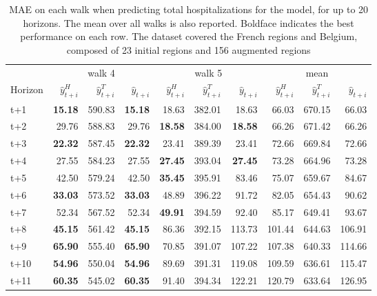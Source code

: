 \begin{table}[H]
\centering
\caption{MAE on each walk when predicting total hospitalizations for the model, for up to 20 horizons. The mean over all walks is also reported. Boldface indicates the best performance on each row. The dataset covered the French regions and Belgium, composed of 23 initial regions and 156 augmented regions }
\label{tab:MAE_walk_assemble}
\begin{tabular}{lrrrrrrrrr}
\toprule
 & \multicolumn{3}{c}{walk 4} & \multicolumn{3}{c}{walk 5} & \multicolumn{3}{c}{mean} 
\\

\cmidrule(lr){2-4} \cmidrule(lr){5-7} \cmidrule(lr){8-10} 
Horizon & $\hat{y}_{t+i}^H$ & $\hat{y}_{t+i}^T$ & $\hat{y}_{t+i}$ & $\hat{y}_{t+i}^H$ & $\hat{y}_{t+i}^T$ & $\hat{y}_{t+i}$ & $\hat{y}_{t+i}^H$ & $\hat{y}_{t+i}^T$ & $\hat{y}_{t+i}$ \\
\midrule
t+1  & \textbf{15.18}  & 590.83  & \textbf{15.18}  & 18.63  & 382.01  & 18.63  & 66.03  & 670.15  & 66.03  \\
t+2  & 29.76  & 588.83  & 29.76  & \textbf{18.58}  & 384.00  & \textbf{18.58}  & 66.26  & 671.42  & 66.26  \\
t+3  & \textbf{22.32}  & 587.45  & \textbf{22.32}  & 23.41  & 389.39  & 23.41  & 72.66  & 669.84  & 72.66  \\
t+4  & 27.55  & 584.23  & 27.55  & \textbf{27.45}  & 393.04  & \textbf{27.45}  & 73.28  & 664.96  & 73.28  \\
t+5  & 42.50  & 579.24  & 42.50  & \textbf{35.45}  & 395.91  & 83.46  & 75.07  & 659.67  & 84.67  \\
t+6  & \textbf{33.03}  & 573.52  & \textbf{33.03}  & 48.89  & 396.22  & 91.72  & 82.05  & 654.43  & 90.62  \\
t+7  & 52.34  & 567.52  & 52.34  & \textbf{49.91}  & 394.59  & 92.40  & 85.17  & 649.41  & 93.67  \\
t+8  & \textbf{45.15}  & 561.42  & \textbf{45.15}  & 86.36  & 392.15  & 113.73  & 101.44  & 644.63  & 106.91  \\
t+9  & \textbf{65.90}  & 555.40  & \textbf{65.90}  & 70.85  & 391.07  & 107.22  & 107.38  & 640.33  & 114.66  \\
t+10  & \textbf{54.96}  & 550.04  & \textbf{54.96}  & 89.69  & 391.31  & 119.08  & 109.59  & 636.61  & 115.47  \\
t+11  & \textbf{60.35}  & 545.02  & \textbf{60.35}  & 91.40  & 394.34  & 122.21  & 120.79  & 633.64  & 126.95  \\

\end{tabular}
\end{table}
